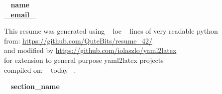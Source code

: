 \documentclass[11pt,english]{article}
\begin{document}

\begin{center}
    \huge\bf\color{maincolor} ~{{ name }}~  \\
    \small\color{black} \href{mailto: ~{{ email }}~ }{ ~{{ email }}~ }
\end{center}

\begin{flushright}
    \vspace{3.5mm}
    \tiny This resume was generated using ~{{ loc }}~ lines of very readable python\\
    \tiny from: \url{https://github.com/QuteBits/resume\_42/}\\
    \tiny and modified by \url{https://github.com/iolaszlo/yaml2latex} \\
    \tiny for extension to general purpose yaml2latex projects \\
    \tiny compiled on: ~{{ today }}~.
\end{flushright}

\vspace{-18mm}



\medskip

\selectfont

\hspace{-20mm}\colorbox{maincolor}{\begin{minipage}[t][8mm][c]{75mm}
\hspace{20mm}\bfseries \color{white}  ~{{ section_name }}~
\end{minipage}}
\vspace{6mm}
\end{document}
